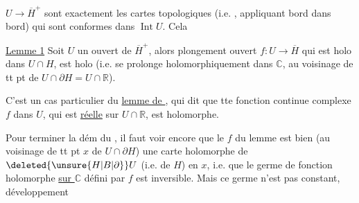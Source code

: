 
$U\longrightarrow\overline H^{+}$ sont exactement les cartes topologiques (i.e. ,  appliquant bord dans bord) qui sont conformes dans $\operatorname{Int}U$. Cela  

\uline{Lemme 1} Soit $U$ un ouvert de $\overline H^{+}$, alors   plongement ouvert $f:U\longrightarrow\overline H$  qui est holo dans $U\cap H$, est holo (i.e. se prolonge holomorphiquement dans $\mathbb C$, au voisinage de tt pt de $U\cap\partial H=U\cap\mathbb R$).

C'est un cas particulier du \uline{lemme de }, qui dit que tte fonction  continue complexe $f$ dans $U$, qui est \uline{réelle} sur $U\cap\mathbb R$, est holomorphe.

Pour terminer la dém du  , il faut voir encore que le $f$ du lemme est bien (au voisinage de tt pt $x$ de $U\cap\partial H$) une carte holomorphe de $\deleted{\unsure{H|B|\partial}}U$ (i.e. de $H$) en $x$, i.e. que le germe  de fonction holomorphe \uline{sur $\mathbb C$} défini par $f$ est inversible. Mais  ce germe n'est pas constant,   développement
